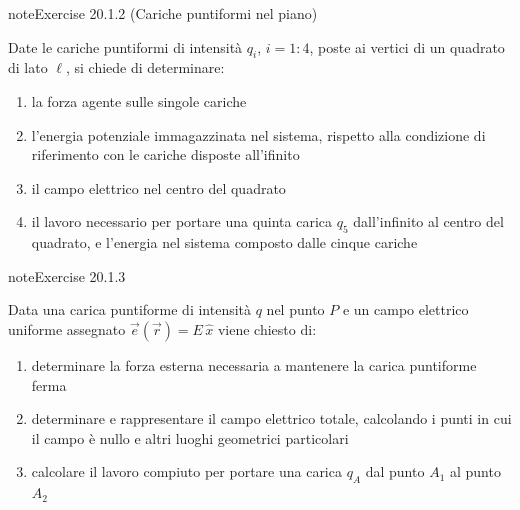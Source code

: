 \documentclass[letterpaper,10pt,italian]{jupyterBook}
\begin{document}
\begin{sphinxadmonition}{note}{Exercise 20.1.2 (Cariche puntiformi nel piano)}



\sphinxAtStartPar
Date le cariche puntiformi di intensità \(q_i\), \(i=1:4\), poste ai vertici di un quadrato di lato \(\ell\), si chiede di determinare:
\begin{enumerate}
%
\item {} 
\sphinxAtStartPar
la forza agente sulle singole cariche

\item {} 
\sphinxAtStartPar
l’energia potenziale immagazzinata nel sistema, rispetto alla condizione di riferimento con le cariche disposte all’ifinito

\item {} 
\sphinxAtStartPar
il campo elettrico nel centro del quadrato

\item {} 
\sphinxAtStartPar
il lavoro necessario per portare una quinta carica \(q_5\) dall’infinito al centro del quadrato, e l’energia nel sistema composto dalle cinque cariche

\end{enumerate}
\end{sphinxadmonition}
 \label{exercise:ch/electromagnetism/electrostatics-problems-exercise-2}

\begin{sphinxadmonition}{note}{Exercise 20.1.3}



\sphinxAtStartPar
Data una carica puntiforme di intensità \(q\) nel punto \(P\) e un campo elettrico uniforme assegnato \(\vec{e}(\vec{r}) = E \, \hat{x}\) viene chiesto di:
\begin{enumerate}
%
\item {} 
\sphinxAtStartPar
determinare la forza esterna necessaria a mantenere la carica puntiforme ferma

\item {} 
\sphinxAtStartPar
determinare e rappresentare il campo elettrico totale, calcolando i punti in cui il campo è nullo e altri luoghi geometrici particolari

\item {} 
\sphinxAtStartPar
calcolare il lavoro compiuto per portare una carica \(q_A\) dal punto \(A_1\) al punto \(A_2\)

\end{enumerate}
\end{sphinxadmonition}
 \label{exercise:ch/electromagnetism/electrostatics-problems-exercise-3}
\end{document}
